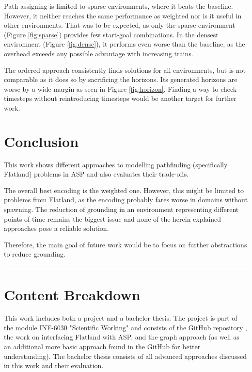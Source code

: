 \documentclass{llncs}
\begin{document}
\begin{multicols*}{2}
Path assigning is limited to sparse environments, where it beats the baseline. However, it neither reaches the same performance as weighted nor is it useful in other environments. That was to be expected, as only the sparse environment (Figure \ref{fig:sparse}) provides few start-goal combinations. In the densest environment (Figure \ref{fig:dense}), it performs even worse than the baseline, as the overhead exceeds any possible advantage with increasing trains.

The ordered approach consistently finds solutions for all environments, but is not comparable as it does so by sacrificing the horizons. Its generated horizons are worse by a wide margin as seen in Figure \ref{fig:horizon}. Finding a way to check timesteps without reintroducing timesteps would be another target for further work.\\

\section*{Conclusion}
This work shows different approaches to modelling pathfinding (specifically Flatland) problems in ASP and also evaluates their trade-offs.

The overall best encoding is the weighted one. However, this might be limited to problems from Flatland, as the encoding probably fares worse in domains without spawning. The reduction of grounding in an environment representing different points of time remains the biggest issue and none of the herein explained approaches pose a reliable solution.

Therefore, the main goal of future work would be to focus on further abstractions to reduce grounding.\\

\hrule
\section*{Content Breakdown}
\small
This work includes both a project and a bachelor thesis. The project is part of the module INF-6030 "Scientific Working" and consists of the GitHub repository \cite{Git24}, the work on interfacing Flatland with ASP, and the graph approach (as well as an additional more basic approach found in the GitHub for better understanding). The bachelor thesis consists of all advanced approaches discussed in this work and their evaluation.


{}
\end{multicols*}
\end{document}
